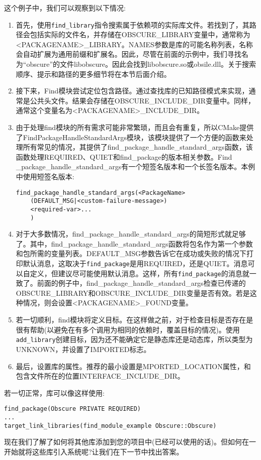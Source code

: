 这个例子中，我们可以观察到以下情况:

\begin{enumerate}
\item 
首先，使用\texttt{find\_library}指令搜索属于依赖项的实际库文件。若找到了，其路径会包括实际的文件名，并存储在OBSCURE\_LIBRARY变量中，通常称为<PACKAGENAME>\_LIBRARY。NAMES参数是库的可能名称列表，名称会自动扩展为通用前缀和扩展名。因此，尽管在前面的示例中，我们寻找名为“obscure”的文件libobscure。因此会找到libobscure.so或obsile.dll。关于搜索顺序、提示和路径的更多细节将在本节后面介绍。

\item 
接下来，Find模块尝试定位包含路径。通过查找库的已知路径模式来实现，通常是公共头文件。结果会存储在OBSCURE\_INCLUDE\_DIR变量中。同样，通常这个变量名为<PACKAGENAME>\_INCLUDE\_DIR。

\item 
由于处理find模块的所有需求可能非常繁琐，而且会有重复，所以CMake提供了FindPackageHandleStandardArgs模块，该模块提供了一个方便的函数来处理所有常见的情况，其提供了find\_package\_handle\_standard\_args函数，该函数处理REQUIRED、QUIET和find\_package的版本相关参数。Find \_package\_handle\_standard\_args有一个短签名版本和一个长签名版本。本例中使用短签名版本:

\begin{lstlisting}[style=styleCMake]
find_package_handle_standard_args(<PackageName>
	(DEFAULT_MSG|<custom-failure-message>)
	<required-var>...
	)
\end{lstlisting}

\item 
对于大多数情况，find\_package\_handle\_standard\_args的简短形式就足够了。其中，find\_package\_handle\_standard\_args函数将包名作为第一个参数和包所需的变量列表。DEFAULT\_MSG参数告诉它在成功或失败的情况下打印默认消息，这取决于\texttt{find\_package}是用REQUIRED，还是QUIET。消息可以自定义，但建议尽可能使用默认消息。这样，所有\texttt{find\_package}的消息就一致了。前面的例子中，find\_package\_handle\_standard\_args检查已传递的OBSCURE\_LIBRARY和OBSCURE\_INCLUDE\_DIR变量是否有效。若是这种情况，则会设置<PACKAGENAME>\_FOUND变量。

\item 
若一切顺利，find模块将定义目标。在这样做之前，对于检查目标是否存在是很有帮助(以避免在有多个调用为相同的依赖时，覆盖目标的情况)。使用\texttt{add\_library}创建目标，因为还不能确定它是静态库还是动态库，所以类型为UNKNOWN，并设置了IMPORTED标志。

\item 
最后，设置库的属性。推荐的最小设置是MPORTED\_LOCATION属性，和包含文件所在的位置INTERFACE\_INCLUDE\_DIR。
\end{enumerate}

若一切正常，库可以像这样使用:

\begin{lstlisting}[style=styleCMake]
find_package(Obscure PRIVATE REQUIRED)
...
target_link_libraries(find_module_example Obscure::Obscure)
\end{lstlisting}

现在我们了解了如何将其他库添加到您的项目中(已经可以使用的话)。但如何在一开始就将这些库引入系统呢?让我们在下一节中找出答案。

